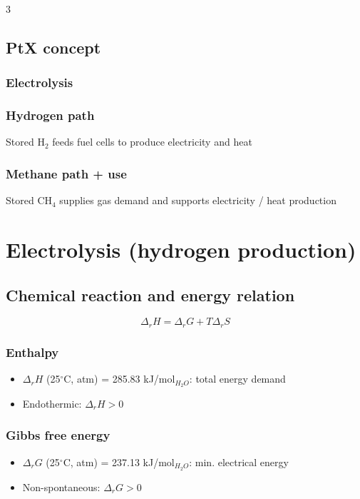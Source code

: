 \documentclass[9pt, landscape, a4paper]{article}
\newcommand{\cel}{\ensuremath{^\circ}C}
\begin{document}
\begin{multicols*}{3}
\subsection{PtX concept}
\subsubsection{Electrolysis}
\begin{center}
\end{center}

\subsubsection{Hydrogen path}
Stored H$_2$ feeds fuel cells to produce electricity and heat

\subsubsection{Methane path + use}
\begin{center}
\end{center}
Stored CH$_4$ supplies gas demand and supports electricity / heat production

\section{Electrolysis (hydrogen production)}
\subsection{Chemical reaction and energy relation}
\begin{center}
  \[\Delta_r H = \Delta_r G + T\Delta_r S\]
\end{center}

\subsubsection{Enthalpy}
\begin{itemize}
  \item $\Delta_r H$ (25\cel, atm) = 285.83 kJ/mol$_{H_2O}$: total energy demand
  \item Endothermic: $\Delta_r H > 0$
\end{itemize}

\subsubsection{Gibbs free energy}
\begin{itemize}
  \item $\Delta_r G$ (25\cel, atm) = 237.13 kJ/mol$_{H_2O}$: min. electrical energy
  \item Non-spontaneous: $\Delta_r G > 0$
\end{itemize}


\end{multicols*}
\end{document}
